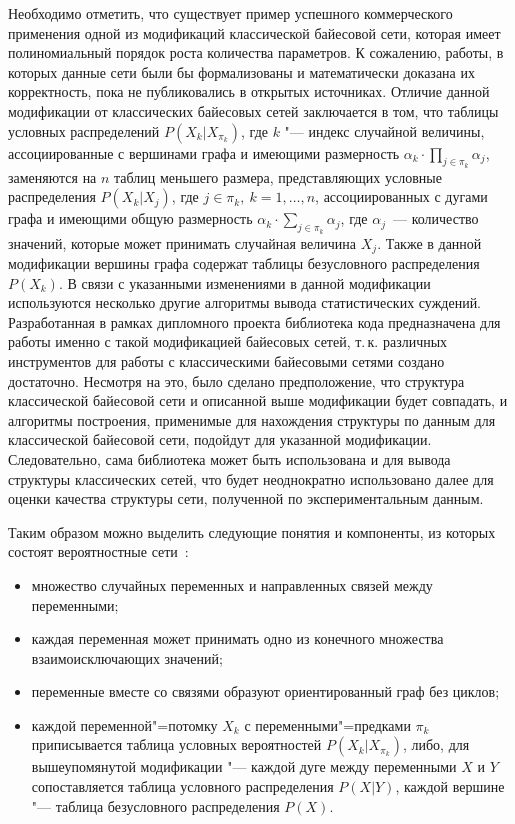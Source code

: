 \label{page:domain:bayes_mod}
Необходимо отметить, что существует пример успешного коммерческого применения одной из модификаций классической байесовой сети, которая имеет полиномиальный порядок роста количества параметров.
К сожалению, работы, в которых данные сети были бы формализованы и математически доказана их корректность, пока не публиковались в открытых источниках.
Отличие данной модификации от классических байесовых сетей заключается в том, что таблицы условных распределений $ P(X_k | X_{\pi_k}) $, где $k$ "--- индекс случайной величины, ассоциированные с вершинами графа и имеющими размерность $ \alpha_k \cdot \prod_{j \in \pi_k}\alpha_j $, заменяются на $ n $ таблиц меньшего размера, представляющих условные распределения $ P(X_k | X_j) $, где $ j \in \pi_k,\ k = 1,\dotsc,n $, ассоциированных с дугами графа и имеющими общую размерность $ \alpha_k \cdot \sum_{j \in \pi_k}\alpha_j $, где $\alpha_j$~--- количество значений, которые может принимать случайная величина $X_j$.
Также в данной модификации вершины графа содержат таблицы безусловного распределения $ P(X_k) $.
В связи с указанными изменениями в данной модификации используются несколько другие алгоритмы вывода статистических суждений.
Разработанная в рамках дипломного проекта библиотека кода предназначена для работы именно с такой модификацией байесовых сетей, т.\,к. различных инструментов для работы с классическими байесовыми сетями создано достаточно.
Несмотря на это, было сделано предположение, что структура классической байесовой сети и описанной выше модификации будет совпадать, и алгоритмы построения, применимые для нахождения структуры по данным для классической байесовой сети, подойдут для указанной модификации.
Следовательно, сама библиотека может быть использована и для вывода структуры классических сетей, что будет неоднократно использовано далее для оценки качества структуры сети, полученной по экспериментальным данным.

Таким образом можно выделить следующие понятия и компоненты, из которых состоят вероятностные сети~\cite{terehov_2003}:
\begin{itemize}
    \item множество случайных переменных и направленных связей между переменными;
    \item каждая переменная может принимать одно из конечного множества взаимоисключающих значений;
    \item переменные вместе со связями образуют ориентированный граф без циклов;
    \item каждой переменной"=потомку $X_k$ с переменными"=предками $\pi_k$
        приписывается таблица условных вероятностей $P(X_k | X_{\pi_k})$, либо, для вышеупомянутой модификации "--- каждой дуге между переменными $ X $ и $ Y $ сопоставляется таблица условного распределения $ P (X | Y)$, каждой вершине "--- таблица безусловного распределения $ P(X) $.
\end{itemize}

